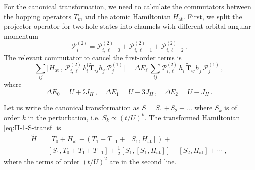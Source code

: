 For the canonical transformation, we need to calculate the commutators between the hopping operators $T_m$ and the atomic Hamiltonian $H_{\mathrm{at}}$. First, we split the projector operator for two-hole states into channels with different orbital angular momentum
\begin{equation}
    \mathcal{P}^{(2)}_{i} = \mathcal{P}^{(2)}_{i,\ell=0}+\mathcal{P}^{(2)}_{i,\ell=1}+\mathcal{P}^{(2)}_{i,\ell=2} \, .
\end{equation}
The relevant commutator to cancel the first-order terms is
\begin{equation}
    \sum_{ij} \big[ H_{\text{at}} \, ,\, \mathcal{P}^{(2)}_{i,\ell} \, h_i^\dagger  \tilde{\mathbf{T}}_{ij} h_j^{\phantom{\dagger}} \, \mathcal{P}^{(1)}_{j} \big] = \Delta E_{\ell}  \, \sum_{ij}  \mathcal{P}^{(2)}_{i,\ell} \, h_i^\dagger  \tilde{\mathbf{T}}_{ij} h_j^{\phantom{\dagger}} \, \mathcal{P}^{(1)}_{j} \, , \label{eq:II-1-comm}
\end{equation}
where
\begin{equation}
    \Delta E_0 = U + 2 J_H \, , \quad
    \Delta E_1 = U - 3 J_H \, , \quad
    \Delta E_2 = U - J_H \, . \label{eq:II-1-delta-E}
\end{equation}



Let us write the canonical transformation as $S=S_1+S_2+...$ where $S_k$ is of order $k$ in the perturbation, i.e. $S_k\propto (t/U)^k$.
The transformed  Hamiltonian \eqref{eq:II-1-S-transf} is
\begin{equation}
\begin{split}
        \tilde{H} &=  T_0 + H_{\text{at}} + \left( T_1 + T_{-1} + [S_1, H_{\text{at}}] \right) +  \\[4pt]
    &+ [S_1, T_0+T_1 + T_{-1}] + \frac{1}{2} [S_1,[S_1, H_{\text{at}}]] + [S_2, H_{\text{at}}] + \cdots \; ,
\end{split}
\end{equation}
where the terms of order $(t/U)^2$ are in the second line.


